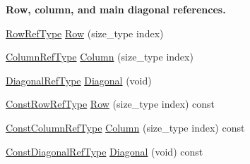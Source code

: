 \begin{Indent}{\bf Row, column, and main diagonal references.}\par
\begin{DoxyCompactItemize}
\item 
\hyperlink{classvct_fixed_size_const_matrix_base_a2ce1bc7d955f66d28462cb34b62d69b7}{Row\-Ref\-Type} \hyperlink{classvct_fixed_size_matrix_base_a8963e27f4adc44551ce264411e80f554}{Row} (size\-\_\-type index)
\item 
\hyperlink{classvct_fixed_size_const_matrix_base_a9cbbc3a040a90709bdeac3b94c766131}{Column\-Ref\-Type} \hyperlink{classvct_fixed_size_matrix_base_a5744915514d3e68fa98895533738f474}{Column} (size\-\_\-type index)
\item 
\hyperlink{classvct_fixed_size_const_matrix_base_ae0b335e845233b49e01f24c1518ee6a1}{Diagonal\-Ref\-Type} \hyperlink{classvct_fixed_size_matrix_base_aa78d775b7c249389f03c0a04f13315e5}{Diagonal} (void)
\item 
\hyperlink{classvct_fixed_size_const_matrix_base_a74355396eec7437755398c2810e0df41}{Const\-Row\-Ref\-Type} \hyperlink{classvct_fixed_size_matrix_base_abf4ba06a3c1d8e064a595e9a29685793}{Row} (size\-\_\-type index) const 
\item 
\hyperlink{classvct_fixed_size_const_matrix_base_a68ed47f84a2855832fa0c18fafda6843}{Const\-Column\-Ref\-Type} \hyperlink{classvct_fixed_size_matrix_base_a4e86ebded9a4b98c29c597f8e1529e53}{Column} (size\-\_\-type index) const 
\item 
\hyperlink{classvct_fixed_size_const_matrix_base_a54699d7dbe28072365fab4aa99c68d66}{Const\-Diagonal\-Ref\-Type} \hyperlink{classvct_fixed_size_matrix_base_a7bc7623ff33e63c493d82c45f536edd6}{Diagonal} (void) const 
\end{DoxyCompactItemize}
\end{Indent}
{\bf }\par
